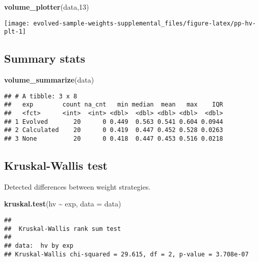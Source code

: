 \documentclass[
]{book}
\newenvironment{Shaded}{\begin{snugshade}}{\end{snugshade}}
\newcommand{\AttributeTok}[1]{\textcolor[rgb]{0.13,0.29,0.53}{#1}}
\newcommand{\DecValTok}[1]{\textcolor[rgb]{0.00,0.00,0.81}{#1}}
\newcommand{\FunctionTok}[1]{\textcolor[rgb]{0.13,0.29,0.53}{\textbf{#1}}}
\newcommand{\NormalTok}[1]{#1}
\newcommand{\SpecialCharTok}[1]{\textcolor[rgb]{0.81,0.36,0.00}{\textbf{#1}}}
\begin{document}
\begin{Shaded}
\begin{Highlighting}[]
\FunctionTok{volume\_plotter}\NormalTok{(data,}\DecValTok{13}\NormalTok{)}
\end{Highlighting}
\end{Shaded}

\texttt{[image: evolved-sample-weights-supplemental\_files/figure-latex/pp-hv-plt-1]}

\hypertarget{summary-stats-11}{%
\subsection{Summary stats}\label{summary-stats-11}}

\begin{Shaded}
\begin{Highlighting}[]
\FunctionTok{volume\_summarize}\NormalTok{(data)}
\end{Highlighting}
\end{Shaded}

\begin{verbatim}
## # A tibble: 3 x 8
##   exp        count na_cnt   min median  mean   max    IQR
##   <fct>      <int>  <int> <dbl>  <dbl> <dbl> <dbl>  <dbl>
## 1 Evolved       20      0 0.449  0.563 0.541 0.604 0.0944
## 2 Calculated    20      0 0.419  0.447 0.452 0.528 0.0263
## 3 None          20      0 0.418  0.447 0.453 0.516 0.0218
\end{verbatim}

\hypertarget{kruskal-wallis-test-11}{%
\subsection{Kruskal-Wallis test}\label{kruskal-wallis-test-11}}

Detected differences between weight strategies.

\begin{Shaded}
\begin{Highlighting}[]
\FunctionTok{kruskal.test}\NormalTok{(hv }\SpecialCharTok{\textasciitilde{}}\NormalTok{ exp, }\AttributeTok{data =}\NormalTok{ data)}
\end{Highlighting}
\end{Shaded}

\begin{verbatim}
## 
##  Kruskal-Wallis rank sum test
## 
## data:  hv by exp
## Kruskal-Wallis chi-squared = 29.615, df = 2, p-value = 3.708e-07
\end{verbatim}
\end{document}
